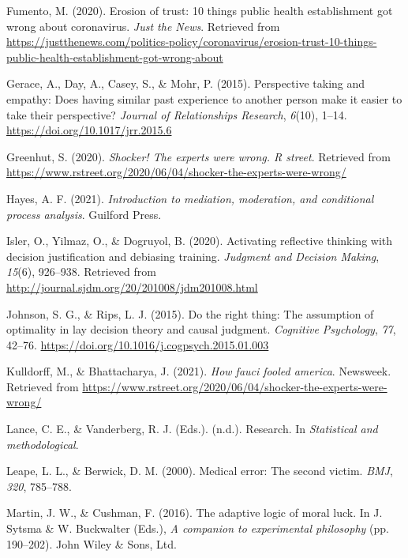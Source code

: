 \documentclass[
  man,floatsintext]{apa6}
\newlength{\cslhangindent}
\newlength{\cslentryspacingunit} %
\newenvironment{CSLReferences}[2] %
 {%
  \setlength{\parindent}{0pt}
  \ifodd #1
  \let\oldpar\par
  \def\par{\hangindent=\cslhangindent\oldpar}
  \fi
  \setlength{\parskip}{#2\cslentryspacingunit}
 }%
 {}
\begin{document}
\begin{CSLReferences}{1}{0}
\leavevmode{}%
Fumento, M. (2020). Erosion of trust: 10 things public health establishment got wrong about coronavirus. \emph{Just the News}. Retrieved from \url{https://justthenews.com/politics-policy/coronavirus/erosion-trust-10-things-public-health-establishment-got-wrong-about}

\leavevmode{}%
Gerace, A., Day, A., Casey, S., \& Mohr, P. (2015). Perspective taking and empathy: Does having similar past experience to another person make it easier to take their perspective? \emph{Journal of Relationships Research}, \emph{6}(10), 1--14. \url{https://doi.org/10.1017/jrr.2015.6}

\leavevmode{}%
Greenhut, S. (2020). \emph{Shocker! The experts were wrong. R street}. Retrieved from \url{https://www.rstreet.org/2020/06/04/shocker-the-experts-were-wrong/}

\leavevmode{}%
Hayes, A. F. (2021). \emph{Introduction to mediation, moderation, and conditional process analysis}. Guilford Press.

\leavevmode{}%
Isler, O., Yilmaz, O., \& Dogruyol, B. (2020). Activating reflective thinking with decision justification and debiasing training. \emph{Judgment and Decision Making}, \emph{15}(6), 926--938. Retrieved from \url{http://journal.sjdm.org/20/201008/jdm201008.html}

\leavevmode{}%
Johnson, S. G., \& Rips, L. J. (2015). Do the right thing: The assumption of optimality in lay decision theory and causal judgment. \emph{Cognitive Psychology}, \emph{77}, 42--76. \url{https://doi.org/10.1016/j.cogpsych.2015.01.003}

\leavevmode{}%
Kulldorff, M., \& Bhattacharya, J. (2021). \emph{How fauci fooled america}. Newsweek. Retrieved from \url{https://www.rstreet.org/2020/06/04/shocker-the-experts-were-wrong/}

\leavevmode{}%
Lance, C. E., \& Vanderberg, R. J. (Eds.). (n.d.). Research. In \emph{Statistical and methodological}.

\leavevmode{}%
Leape, L. L., \& Berwick, D. M. (2000). Medical error: The second victim. \emph{BMJ}, \emph{320}, 785--788.

\leavevmode{}%
Martin, J. W., \& Cushman, F. (2016). The adaptive logic of moral luck. In J. Sytsma \& W. Buckwalter (Eds.), \emph{A companion to experimental philosophy} (pp. 190--202). John Wiley \& Sons, Ltd.


\end{CSLReferences}
\end{document}
